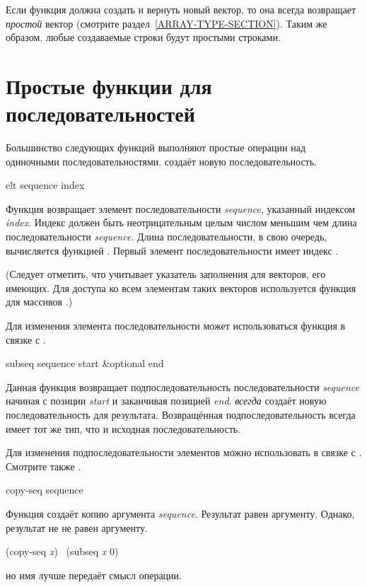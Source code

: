 Если функция должна создать и вернуть новый вектор, то она всегда возвращает
\emph{простой} вектор (смотрите раздел~\ref{ARRAY-TYPE-SECTION}).
Таким же образом, любые создаваемые строки будут простыми строками.

\section{Простые функции для последовательностей}

Большинство следующих функций выполняют простые операции над одиночными
последовательностями.  создаёт новую последовательность.

\begin{defun}[Функция]
elt sequence index

Функция возвращает элемент последовательности \emph{sequence}, указанный
индексом \emph{index}. Индекс должен быть неотрицательным целым числом меньшим
чем длина последовательности \emph{sequence}. Длина последовательности, в свою
очередь, вычисляется функцией .
Первый элемент последовательности имеет индекс .

(Следует отметить, что  учитывает указатель заполнения для векторов,
его имеющих. Для доступа ко всем элементам таких векторов используется функция
для массивов .)

Для изменения элемента последовательности может использоваться функция
 в связке с .
\end{defun}

\begin{defun}[Функция]
subseq sequence start &optional end

Данная функция возвращает подпоследовательность последовательности
\emph{sequence} начиная с позиции \emph{start} и заканчивая позицией
\emph{end}. 
 \emph{всегда} создаёт новую последовательность для
результата. Возвращённая подпоследовательность всегда имеет тот же тип, что и
исходная последовательность.

Для изменения подпоследовательности элементов можно использовать  в
связке с . Смотрите также .
\end{defun}

\begin{defun}[Функция]
copy-seq sequence

Функция создаёт копию аргумента \emph{sequence}. Результат равен 
аргументу. Однако, результат не не равен  аргументу.
\begin{lisp}
(copy-seq \emph{x}) \EQ\ (subseq \emph{x} 0)
\end{lisp}
но имя  лучше передаёт смысл операции.
\end{defun}

